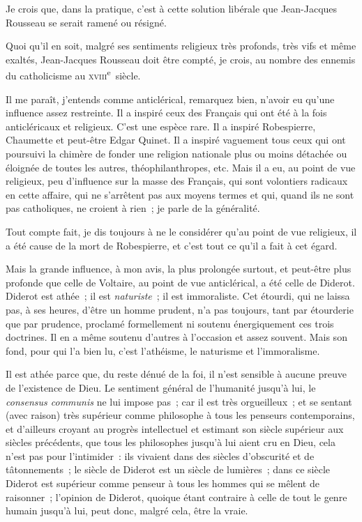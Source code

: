 \documentclass[french,twoside]{book} %
\begin{document}
Je crois que, dans la pratique, c’est à cette solution libérale que Jean-Jacques Rousseau se serait ramené ou résigné.\par
Quoi qu’il en soit, malgré ses sentiments religieux  très profonds, très vifs et même exaltés, Jean-Jacques Rousseau doit être compté, je crois, au nombre des ennemis du catholicisme au \textsc{xviii}\textsuperscript{e} siècle.\par
Il me paraît, j’entends comme anticlérical, remarquez bien, n’avoir eu qu’une influence assez restreinte. Il a inspiré ceux des Français qui ont été à la fois anticléricaux et religieux. C’est une espèce rare. Il a inspiré Robespierre, Chaumette et peut-être Edgar Quinet. Il a inspiré vaguement tous ceux qui ont poursuivi la chimère de fonder une religion nationale plus ou moins détachée ou éloignée de toutes les autres, théophilanthropes, etc. Mais il a eu, au point de vue religieux, peu d’influence sur la masse des Français, qui sont volontiers radicaux en cette affaire, qui ne s’arrêtent pas aux moyens termes et qui, quand ils ne sont pas catholiques, ne croient à rien ; je parle de la généralité.\par
Tout compte fait, je dis toujours à ne le considérer qu’au point de vue religieux, il a été cause de la mort de Robespierre, et c’est tout ce qu’il a fait à cet égard.\par
Mais la grande influence, à mon avis, la plus prolongée surtout, et peut-être plus profonde que celle de Voltaire, au point de vue anticlérical, a été celle de Diderot. Diderot est athée ; il est {\itshape naturiste} ;  il est immoraliste. Cet étourdi, qui ne laissa pas, à ses heures, d’être un homme prudent, n’a pas toujours, tant par étourderie que par prudence, proclamé formellement ni soutenu énergiquement ces trois doctrines. Il en a même soutenu d’autres à l’occasion et assez souvent. Mais son fond, pour qui l’a bien lu, c’est l’athéisme, le naturisme et l’immoralisme.\par
Il est athée parce que, du reste dénué de la foi, il n’est sensible à aucune preuve de l’existence de Dieu. Le sentiment général de l’humanité jusqu’à lui, le {\itshape consensus communis} ne lui impose pas ; car il est très orgueilleux ; et se sentant (avec raison) très supérieur comme philosophe à tous les penseurs contemporains, et d’ailleurs croyant au progrès intellectuel et estimant son siècle supérieur aux siècles précédents, que tous les philosophes jusqu’à lui aient cru en Dieu, cela n’est pas pour l’intimider : ils vivaient dans des siècles d’obscurité et de tâtonnements ; le siècle de Diderot est un siècle de lumières ; dans ce siècle Diderot est supérieur comme penseur à tous les hommes qui se mêlent de raisonner ; l’opinion de Diderot, quoique étant contraire à celle de tout le genre humain jusqu’à lui, peut donc, malgré cela, être la vraie.\par
\end{document}
